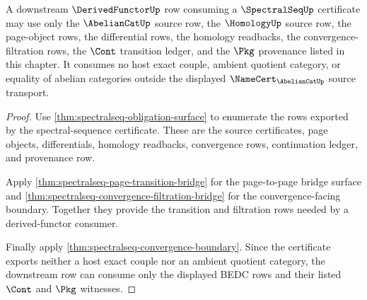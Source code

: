 \begin{theorem}
\label{thm:spectralseq-derivedfunctor-consumer-surface}
A downstream $\DerivedFunctorUp$ row consuming a $\SpectralSeqUp$ certificate
may use only the $\AbelianCatUp$ source row, the $\HomologyUp$ source row, the
page-object rows, the differential rows, the homology readbacks, the
convergence-filtration rows, the $\Cont$ transition ledger, and the $\Pkg$
provenance listed in this chapter. It consumes no host exact couple, ambient
quotient category, or equality of abelian categories outside the displayed
$\NameCert_{\AbelianCatUp}$ source transport.
\end{theorem}
\begin{proof}
Use \autoref{thm:spectralseq-obligation-surface} to enumerate the rows exported
by the spectral-sequence certificate. These are the source certificates, page
objects, differentials, homology readbacks, convergence rows, continuation
ledger, and provenance row.

Apply \autoref{thm:spectralseq-page-transition-bridge} for the page-to-page
bridge surface and \autoref{thm:spectralseq-convergence-filtration-bridge} for
the convergence-facing boundary. Together they provide the transition and
filtration rows needed by a derived-functor consumer.

Finally apply \autoref{thm:spectralseq-convergence-boundary}. Since the
certificate exports neither a host exact couple nor an ambient quotient
category, the downstream row can consume only the displayed BEDC rows and their
listed $\Cont$ and $\Pkg$ witnesses.
\end{proof}

